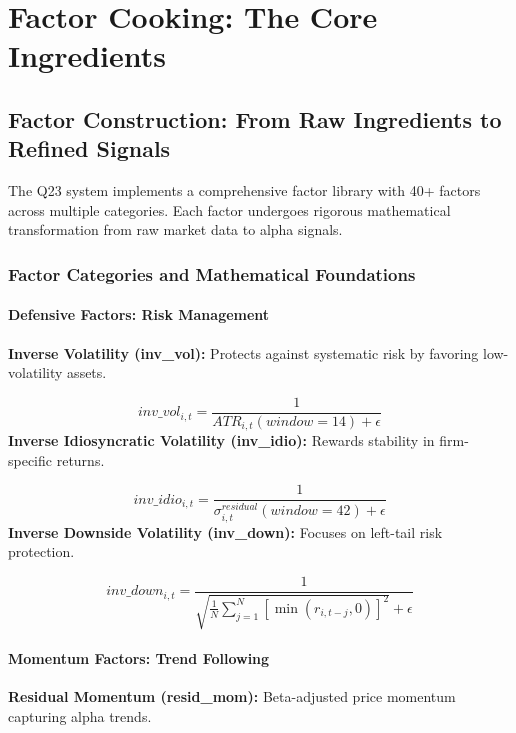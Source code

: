 \documentclass[11pt,letterpaper,openany]{book}
\begin{document}
\chapter{Factor Cooking: The Core Ingredients}

\section{Factor Construction: From Raw Ingredients to Refined Signals}

The Q23 system implements a comprehensive factor library with 40+ factors across multiple categories. Each factor undergoes rigorous mathematical transformation from raw market data to alpha signals.

\subsection{Factor Categories and Mathematical Foundations}

\subsubsection{Defensive Factors: Risk Management}

\textbf{Inverse Volatility (inv\_vol):}
Protects against systematic risk by favoring low-volatility assets.

\begin{equation}
inv\_vol_{i,t} = \frac{1}{ATR_{i,t}(window=14) + \epsilon}
\end{equation}
\textbf{Inverse Idiosyncratic Volatility (inv\_idio):}
Rewards stability in firm-specific returns.

\begin{equation}
inv\_idio_{i,t} = \frac{1}{\sigma_{i,t}^{residual}(window=42) + \epsilon}
\end{equation}
\textbf{Inverse Downside Volatility (inv\_down):}
Focuses on left-tail risk protection.

\begin{equation}
inv\_down_{i,t} = \frac{1}{\sqrt{\frac{1}{N} \sum_{j=1}^N [\min(r_{i,t-j}, 0)]^2} + \epsilon}
\end{equation}

\subsubsection{Momentum Factors: Trend Following}
\textbf{Residual Momentum (resid\_mom):}
Beta-adjusted price momentum capturing alpha trends.
\end{document}

